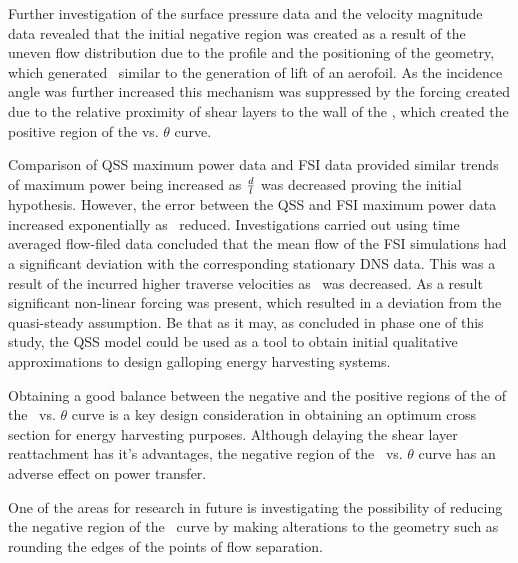 Further investigation of the surface pressure data and the velocity magnitude data revealed that the initial negative region was created as a result of the uneven flow distribution due to the profile and the positioning of the geometry, which generated \cy\ similar to the generation of lift of an aerofoil. As the incidence angle was further increased this mechanism was suppressed by the forcing created due to the relative proximity of shear layers to the wall of the , which created the positive region of the \cy vs. $\theta$ curve. 

Comparison of QSS maximum power data and FSI data provided similar trends of maximum power being increased as $\frac{d}{l}$ was decreased proving the initial hypothesis. However, the error between the QSS and FSI maximum power data increased exponentially as \ratio\ reduced. Investigations carried out using time averaged flow-filed data concluded that the mean flow of the FSI simulations had a significant deviation with the corresponding stationary DNS data. This was a result of the incurred higher  traverse velocities as \ratio\ was decreased. As a result significant non-linear forcing was present, which resulted in a deviation from the quasi-steady assumption. Be that as it may, as concluded in phase one of this study, the QSS model could be used as a tool to obtain initial qualitative approximations to design galloping energy harvesting systems. 

Obtaining a good balance between the negative and the positive regions of the of the \cy\ vs. $\theta$ curve is a key design consideration in obtaining an optimum cross section for energy harvesting purposes. Although delaying the shear layer reattachment has it's advantages, the negative region of the \cy\ vs. $\theta$ curve has an adverse effect on power transfer. 

One of the areas for research in future is investigating the possibility of reducing the negative region of the \cy\ curve by making alterations to the geometry such as rounding the edges of the points of flow separation. 







  

